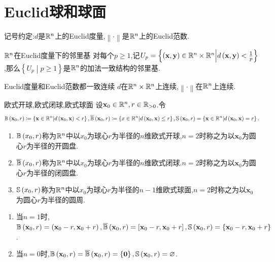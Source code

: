 \section{Euclid球和球面}

记号约定:$d$是$\R^{n}$上的Euclid度量,$\left\|\cdot\right\|$是$\R^{n}$上的Euclid范数.

\begin{proposition}{$\R^{n}$在Euclid度量下的邻里基}{}
	对每个$p\geq 1$,记$U_{p}=\left\{\left(\mathbf{x},\mathbf{y}\right)\in\R^{n}\times\R^{n}\middle|d\left(\mathbf{x},\mathbf{y}\right)<\frac{1}{p}\right\}$,那么$\left\{U_{p}\middle|p\geq 1\right\}$是$\R^{n}$的加法一致结构的邻里基.
\end{proposition}

\begin{proposition}{Euclid度量和Euclid范数都一致连续}{}
	$d$在$\R^{n}\times\R^{n}$上连续,$\left\|\cdot\right\|$在$\R^{n}$上连续.
\end{proposition}

\begin{definition}{欧式开球,欧式闭球,欧式球面}{}
	设$\mathbf{x}_{0}\in\R^{n},r\in\R_{>0}$.令
	\begin{align*}
		\B\left(\mathbf{x}_{0},r\right)\coloneq\left\{\mathbf{x}\in\R^{n}\middle|d\left(\mathbf{x}_{0},\mathbf{x}\right)<r\right\},
		\overline{\B}\left(\mathbf{x}_{0},r\right)\coloneq\left\{x\in\R^{n}\middle|d\left(\mathbf{x}_{0},\mathbf{x}\right)\leq r\right\},
		\S\left(\mathbf{x}_{0},r\right)=\left\{\mathbf{x}\in\R^{n}\middle|d\left(\mathbf{x}_{0},\mathbf{x}\right)=r\right\}.
	\end{align*}
	\begin{enumerate}
		\item $\B\left(x_{0},r\right)$称为$\R^{n}$中以$x_{0}$为球心$r$为半径的$n$维欧式开球,$n=2$时称之为以$\mathbf{x}_{0}$为圆心$r$为半径的开圆盘.
		\item $\overline{\B}\left(x_{0},r\right)$称为$\R^{n}$中以$x_{0}$为球心$r$为半径的$n$维欧式闭球.$n=2$时称之为以$\mathbf{x}_{0}$为圆心$r$为半径的闭圆盘.
		\item $\S\left(x_{0},r\right)$称为$\R^{n}$中以$x_{0}$为球心$r$为半径的$n-1$维欧式球面,$n=2$时称之为以$\mathbf{x}_{0}$为圆心$r$为半径的圆周.
	\end{enumerate}
\end{definition}

\begin{remark}{}{}
	\begin{enumerate}
		\item 当$n=1$时,$\B\left(\mathbf{x}_{0},r\right)=\left(\mathbf{x}_{0}-r,\mathbf{x}_{0}+r\right),\overline{\B}\left(\mathbf{x}_{0},r\right)=\left[\mathbf{x}_{0}-r,\mathbf{x}_{0}+r\right],\S\left(\mathbf{x}_{0},r\right)=\left\{\mathbf{x}_{0}-r,\mathbf{x}_{0}+r\right\}$.
		\item 当$n=0$时,$\B\left(\mathbf{x}_{0},r\right)=\overline{\B}\left(\mathbf{x}_{0},r\right)=\left\{\mathbf{0}\right\},\S\left(\mathbf{x}_{0},r\right)=\emptyset$.
	\end{enumerate}
\end{remark}

